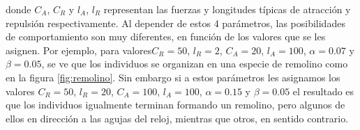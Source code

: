 donde $C_A$, $C_R$ y $l_A$, $l_R$ representan las fuerzas y longitudes típicas de atracción y repulsión respectivamente. Al depender de estos 4 parámetros, las posibilidades de comportamiento son muy diferentes, en función de los valores que se les asignen. Por ejemplo, para valores\linebreak $C_R = 50$, $l_R = 2$, $C_A = 20$, $l_A = 100$, $\alpha = 0.07$ y $\beta = 0.05$, se ve que los individuos se organizan en una especie de remolino como en la figura \ref{fig:remolino}. Sin embargo si a estos parámetros les asignamos los valores $C_R = 50$, $l_R = 20$, $C_A = 100$, $l_A = 100$, $\alpha = 0.15$ y $\beta = 0.05$ el resultado es que los individuos igualmente terminan formando un remolino, pero algunos de ellos en dirección a las agujas del reloj, mientras que otros, en sentido contrario. 

